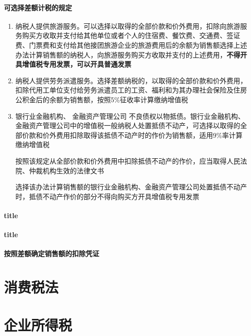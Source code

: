 \documentclass[UTF8,12pt]{ctexart}
\numberwithin{equation}{section} %
\numberwithin{figure}{section}
\numberwithin{table}{section}
\begin{document}
	\paragraph{可选择差额计税的规定}
	\begin{enumerate}
		\item 纳税人提供旅游服务。可以选择以取得的全部价款和价外费用，扣除向旅游服务购买方收取并支付给其他单位或者个人的住宿费、餐饮费、交通费、签证费、门票费和支付给其他接团旅游企业的旅游费用后的余额为销售额选择上述办法计算销售额的纳税人，向旅游服务购买方收取并支付的上述费用，\textbf{不得开具增值税专用发票，可以开具普通发票}
		
		\item 纳税人提供劳务派遣服务。选择差额纳税的，以取得的全部价款和价外费用，扣除代用工单位支付给劳务派遣员工的工资、福利和为其办理社会保险及住房公积金后的余额为销售额，按照5\%征收率计算缴纳增值税
		
		\item 银行业金融机构、 金融资产管理公司 不良债权以物抵债。银行业金融机构、金融资产管理公司中的增值税一般纳税人处置抵债不动产，可选择以取得的全部价款和价外费用扣除取得该抵债不动产时的作价为销售额，适用9\%率计算缴纳增值税
		
		按照该规定从全部价款和价外费用中扣除抵债不动产的作价，应当取得人民法院、仲裁机构生效的法律文书
		
		选择该办法计算销售额的银行业金融机构、金融资产管理公司处置抵债不动产时，抵债不动产作价的部分不得向购买方开具增值税专用发票
	\end{enumerate}
	
	\paragraph{title}
	
	\paragraph{title}
	
	\paragraph{按照差额确定销售额的扣除凭证}
	
	\section{消费税法}
	
	\section{企业所得税}
	
\end{document}
